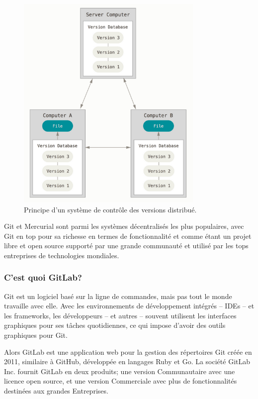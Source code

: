 \begin{figure}[H]
    \centering
    \includegraphics[width=9cm]{images/distributed-scm.png}
    \caption{Principe d'un système de contrôle des versions distribué.}
    \label{fig:distributed-scm}
\end{figure}

Git et Mercurial sont parmi les systèmes décentralisés les plus populaires, avec Git en top pour sa richesse en termes de fonctionnalité et comme étant un projet libre et open source supporté par une grande communauté et utilisé par les tops entreprises de technologies mondiales.

\subsubsection{C’est quoi GitLab?}
Git est un logiciel basé sur la ligne de commandes, mais pas tout le monde travaille avec elle. Avec les environnements de développement intégrés – IDEs – et les frameworks, les développeurs – et autres – souvent utilisent les interfaces graphiques pour ses tâches quotidiennes, ce qui impose d’avoir des outils graphiques pour Git.
\newline

Alors GitLab est une application web pour la gestion des répertoires Git créée en 2011, similaire à GitHub, développée en langages Ruby et Go. La société GitLab Inc. fournit GitLab en deux produits; une version Communautaire avec une licence open source, et une version Commerciale avec plus de fonctionnalités destinées aux grandes Entreprises.

